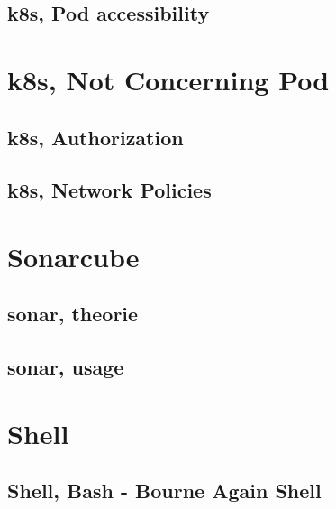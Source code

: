 \documentclass[8pt]{beamer}
\begin{document}



\subsection{k8s, Pod accessibility}




\section{k8s, Not Concerning Pod}
\subsection{k8s, Authorization}




\subsection{k8s, Network Policies}



\section{Sonarcube}

\subsection{sonar, theorie}




\subsection{sonar, usage}





\section{Shell}

\subsection{Shell, Bash - Bourne Again Shell}
\end{document}
